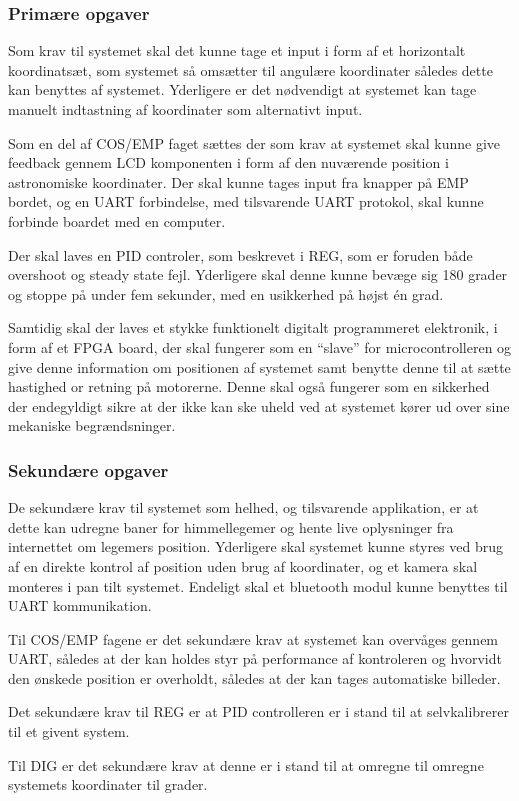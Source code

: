\subsubsection{Primære opgaver}

Som krav til systemet skal det kunne tage et input i form af et horizontalt koordinatsæt, som systemet så omsætter til angulære koordinater således dette kan benyttes af systemet. Yderligere er det nødvendigt at systemet kan tage manuelt indtastning af koordinater som alternativt input.

Som en del af COS/EMP faget sættes der som krav at systemet skal kunne give feedback gennem LCD komponenten i form af den nuværende position i astronomiske koordinater. Der skal kunne tages input fra knapper på EMP bordet, og en UART forbindelse, med tilsvarende UART protokol, skal kunne forbinde boardet med en computer.

Der skal laves en PID controler, som beskrevet i REG, som er foruden både overshoot og steady state fejl. Yderligere skal denne kunne bevæge sig 180 grader og stoppe på under fem sekunder, med en usikkerhed på højst én grad.

Samtidig skal der laves et stykke funktionelt digitalt programmeret elektronik, i form af et FPGA board, der skal fungerer som en ``slave'' for microcontrolleren og give denne information om positionen af systemet samt benytte denne til at sætte hastighed or retning på motorerne. Denne skal også fungerer som en sikkerhed der endegyldigt sikre at der ikke kan ske uheld ved at systemet kører ud over sine mekaniske begrændsninger.

\subsubsection{Sekundære opgaver}

De sekundære krav til systemet som helhed, og tilsvarende applikation, er at dette kan udregne baner for himmellegemer og hente live oplysninger fra internettet om legemers position. Yderligere skal systemet kunne styres ved brug af en direkte kontrol af position uden brug af koordinater, og et kamera skal monteres i pan tilt systemet. Endeligt skal et bluetooth modul kunne benyttes til UART kommunikation.

Til COS/EMP fagene er det sekundære krav at systemet kan overvåges gennem UART, således at der kan holdes styr på performance af kontroleren og hvorvidt den ønskede position er overholdt, således at der kan tages automatiske billeder.

Det sekundære krav til REG er at PID controlleren er i stand til at selvkalibrerer til et givent system.

Til DIG er det sekundære krav at denne er i stand til at omregne til omregne systemets koordinater til grader.